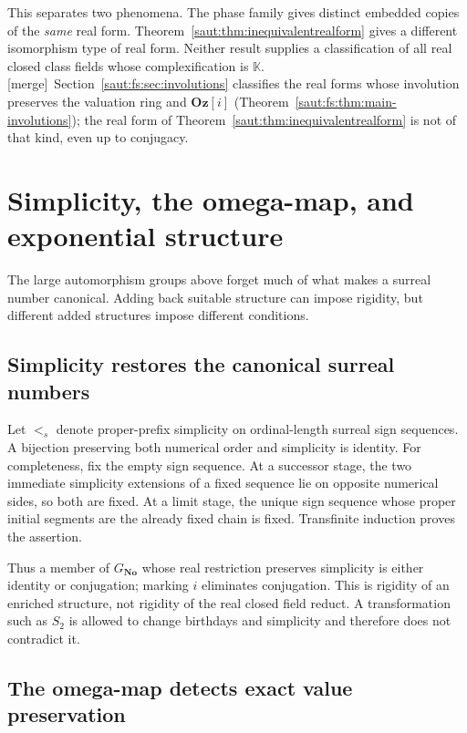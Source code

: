\documentclass[11pt]{article}
\theoremstyle{definition}
\theoremstyle{remark}
\newcommand{\No}{\mathbf{No}}
\newcommand{\K}{\mathbb K}
\newcommand{\Oz}{\mathbf{Oz}}
\newcommand{\mergetag}{\textup{[merge]}}
\numberwithin{equation}{section}
\begin{document}
This separates two phenomena. The phase family gives distinct embedded
copies of the \emph{same} real form. Theorem~\ref{saut:thm:inequivalentrealform}
gives a different isomorphism type of real form. Neither result supplies a
classification of all real closed class fields whose complexification is
$\K$. \mergetag\ Section~\ref{saut:fs:sec:involutions} classifies the real forms
whose involution preserves the valuation ring and $\Oz[i]$
(Theorem~\ref{saut:fs:thm:main-involutions}); the real form of
Theorem~\ref{saut:thm:inequivalentrealform} is not of that kind, even up to
conjugacy.

\section{Simplicity, the omega-map, and exponential structure}\label{saut:sec:exponential}

The large automorphism groups above forget much of what makes a surreal
number canonical. Adding back suitable structure can impose rigidity, but
different added structures impose different conditions.

\subsection{Simplicity restores the canonical surreal numbers}

Let $<_{s}$ denote proper-prefix simplicity on ordinal-length surreal sign
sequences. A bijection preserving both numerical order and simplicity is
identity. For completeness, fix the empty sign sequence. At a successor
stage, the two immediate simplicity extensions of a fixed sequence lie on
opposite numerical sides, so both are fixed. At a limit stage, the unique
sign sequence whose proper initial segments are the already fixed chain
is fixed. Transfinite induction proves the assertion.

Thus a member of $G_{\No}$ whose real restriction preserves simplicity is
either identity or conjugation; marking $i$ eliminates conjugation. This
is rigidity of an enriched structure, not rigidity of the real closed
field reduct. A transformation such as $S_2$ is allowed to change birthdays
and simplicity and therefore does not contradict it.

\subsection{The omega-map detects exact value preservation}
\end{document}
